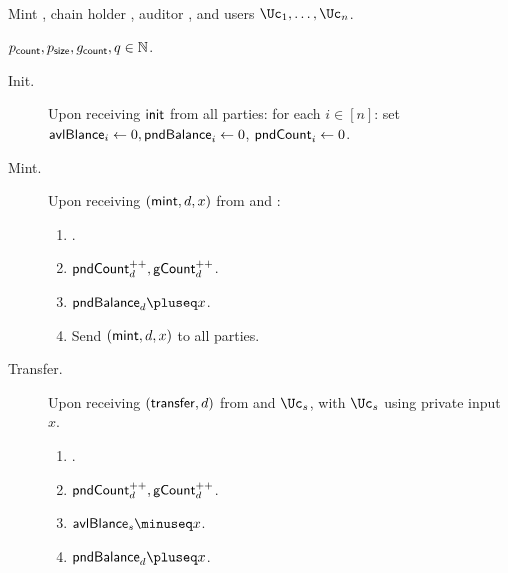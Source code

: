 \begin{functionality}\label{func:ConfidentialTransactions}~
	
	
	
	\item[Parties:]	Mint \Mc, chain holder  \Cc, auditor \Auditor,  and users  $\Uc_1, 
	\ldots,\Uc_n$.
	
	
	\item[Parameters:] $p_{\mathsf{count}},p_{\mathsf{size}},g_{\mathsf{count}}, q \in {\mathbb{N}}$.
	
	
	\begin{description}
		\item[Init.] Upon receiving $\mathsf{init}$ from  all parties: for each $i\in [n]$:  set $\mathsf{avlBlance}_i\leftarrow 0,\mathsf{pndBalance}_i \leftarrow 0$, $\mathsf{pndCount}_i \leftarrow 0$.
		
			\item[Mint.]   Upon receiving $(\mathsf{mint},d,x)$ from  \Cc and \Mc:
		\begin{enumerate}
			
			
			\item {}.
			
			\item $\mathsf{pndCount}_d^{++},\mathsf{gCount}_d^{++}$.
			
			\item $\pendbalance_d \pluseq x$.
			
			\item Send $(\mathsf{mint},d,x)$ to all parties.
		\end{enumerate}
		
		
		\item[Transfer.]    Upon receiving  $(\mathsf{transfer},d)$ from  \Cc and  $\Uc_s$, with  $\Uc_s$ using private input $x$. 
		
	
		\begin{enumerate}
			\item {}.
			
				\item $\mathsf{pndCount}_d^{++},\mathsf{gCount}_d^{++}$.
				
				
			\item $\balance_s \minuseq x$.
			
			\item   $\pendbalance_d \pluseq x$.
			
			
			

\end{enumerate}
\end{description}
\end{functionality}
